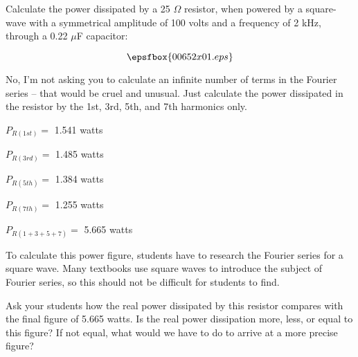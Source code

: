 

Calculate the power dissipated by a 25 $\Omega$ resistor, when powered by a square-wave with a symmetrical amplitude of 100 volts and a frequency of 2 kHz, through a 0.22 $\mu$F capacitor:

$$\epsfbox{00652x01.eps}$$

No, I'm not asking you to calculate an infinite number of terms in the Fourier series -- that would be cruel and unusual.  Just calculate the power dissipated in the resistor by the 1st, 3rd, 5th, and 7th harmonics only.







$P_{R(1st)} =$ 1.541 watts

$P_{R(3rd)} =$ 1.485 watts

$P_{R(5th)} =$ 1.384 watts

$P_{R(7th)} =$ 1.255 watts

$P_{R(1+3+5+7)} =$ 5.665 watts







To calculate this power figure, students have to research the Fourier series for a square wave.  Many textbooks use square waves to introduce the subject of Fourier series, so this should not be difficult for students to find.

Ask your students how the real power dissipated by this resistor compares with the final figure of 5.665 watts.  Is the real power dissipation more, less, or equal to this figure?  If not equal, what would we have to do to arrive at a more precise figure?




